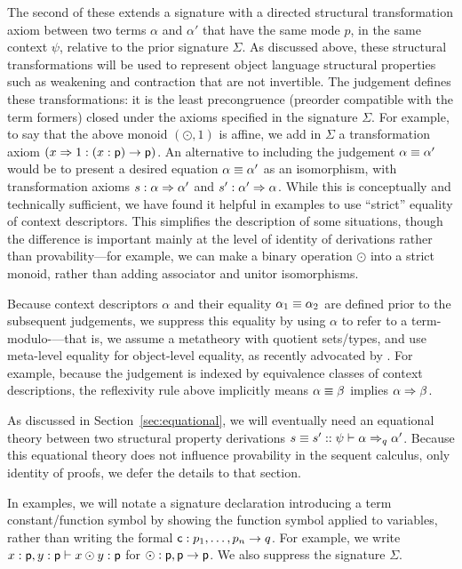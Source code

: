 The second of these extends a signature with a directed structural
transformation axiom between two terms $\alpha$ and $\alpha'$ that have
the same mode $p$, in the same context $\psi$, relative to the prior
signature $\Sigma$.  As discussed above, these structural
transformations will be used to represent object language structural
properties such as weakening and contraction that are not invertible.
The judgement  defines these
transformations: it is the least precongruence (preorder compatible with
the term formers) closed under the axioms specified in the signature
$\Sigma$.  For example, to say that the above monoid $(\odot,1)$ is
affine, we add in $\Sigma$ a transformation axiom $(x \spr 1 : (x:\dsd{p}) \to
{\dsd{p}})$.
{An alternative to including the judgement $\alpha \deq \alpha'$ would be
to present a desired equation $\alpha \deq \alpha'$ as an isomorphism,
with transformation axioms $s : \alpha \spr \alpha'$ and $s' : \alpha'
\spr \alpha$.  While this is conceptually and technically sufficient, we
have found it helpful in examples to use ``strict'' equality of context
descriptors.  This simplifies the description of some situations, though
the difference is important mainly at the level of identity of
derivations rather than provability---for example, we can make a binary
operation $\odot$ into a strict monoid, rather than adding associator
and unitor isomorphisms.
}

Because context descriptors
$\alpha$ and their equality $\alpha_1 \deq \alpha_2$ are defined prior
to the subsequent judgements, we suppress this equality by using
$\alpha$ to refer to a term-modulo-\deq---that is, we assume a
metatheory with quotient sets/types, and use meta-level equality for
object-level equality, as recently advocated by
\citet{altenkirchkaposi16qit}.  For example, because the judgement
 is indexed by equivalence classes of
context descriptions, the reflexivity rule above implicitly means
$\alpha \deq \beta$ implies $\alpha \spr \beta$.
{
As discussed in Section~\ref{sec:equational}, we will eventually need an
equational theory between two structural property derivations $s \deq s'
:: \wfsp{\psi}{\alpha}{\alpha'}{q}$.  Because this equational theory
does not influence provability in the sequent calculus, only identity of
proofs, we defer the details to that section.  

}
In examples, we will notate a signature declaration introducing a term
constant/function symbol by showing the function symbol applied to
variables, rather than writing the formal $\dsd{c} : p_1,\ldots,p_n \to
q$. For example, we write $x : \dsd{p}, y : \dsd{p} \vdash x \odot y :
\dsd{p}$ for $\odot : \dsd{p},\dsd{p} \to \dsd{p}$.  We also suppress
the signature $\Sigma$.

